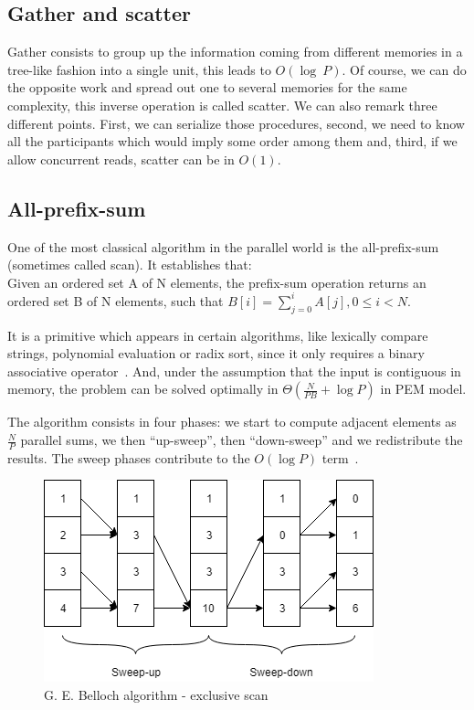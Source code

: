 \subsection{Gather and scatter}

Gather consists to group up the information coming from different memories in a tree-like fashion into a single unit, this leads to $O(\log~P)$. Of course, we can do the opposite work and spread out one to several memories for the same complexity, this inverse operation is called scatter. We can also remark three different points. First, we can serialize those procedures, second, we need to know all the participants which would imply some order among them and, third, if we allow concurrent reads, scatter can be in $O(1)$.

\subsection{All-prefix-sum}

One of the most classical algorithm in the parallel world is the all-prefix-sum (sometimes called scan). It establishes that:\\
Given an ordered set A of N elements, the prefix-sum operation returns an ordered set B of N elements, such that $ B[i] = \sum\limits_{j=0}^{i} A[j], 0 \leqslant i < N $.

It is a primitive which appears in certain algorithms, like lexically compare strings, polynomial evaluation or radix sort, since it only requires a binary associative operator~\cite{blelloch1990prefix}. And, under the assumption that the input is contiguous in memory, the problem can be solved optimally in $\Theta(\frac{N}{PB} + \log P)$ in PEM model.

The algorithm consists in four phases: we start to compute adjacent elements as $\frac{N}{P}$ parallel sums, we then ``up-sweep'', then ``down-sweep'' and we redistribute the results. The sweep phases contribute to the $O(\log P)$ term~\cite{sengupta2008efficient}.

\begin{figure}[!htb]
    \centering
    \includegraphics[width=0.5\linewidth]{Chapters/GPU/Algorithms/Belloch.png} 
    \caption{G. E. Belloch algorithm - exclusive scan}
\end{figure}


